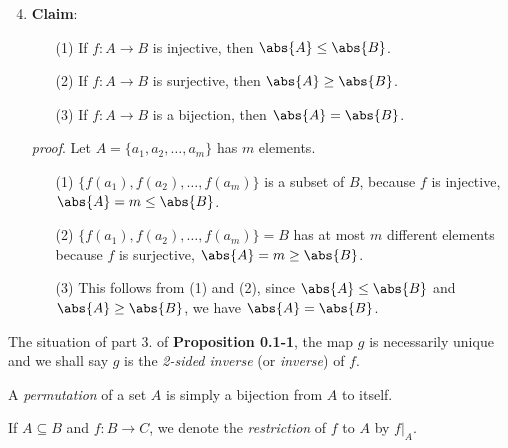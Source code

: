 \newpage
\thispagestyle{oddpagestyle}
\Proppf
{\begin{enumerate}[leftmargin=20pt, itemsep=0pt, topsep=0pt]
    \setcounter{enumi}{3}
    \item {\bf Claim}:
    \begin{itemize}[leftmargin=20pt, itemsep=0pt, topsep=3pt]
        \item [(1)] If $f:A \to B$ is injective, then $\abs{A} \leq \abs{B}$.
        \item [(2)] If $f:A \to B$ is surjective, then $\abs{A} \geq \abs{B}$.
        \item [(3)] If $f:A \to B$ is a bijection, then $\abs{A} = \abs{B}$.
    \end{itemize}
    {\it proof}. Let $A=\{a_{1},a_{2},\dots,a_{m}\}$ has $m$ elements.
    \begin{itemize}[leftmargin=20pt, itemsep=0pt, topsep=3pt]
        \item [(1)] $\{f(a_{1}),f(a_{2}),\dots,f(a_{m})\}$ is a subset of $B$, because $f$ is injective, $\abs{A} = m \leq \abs{B}$.
        \item [(2)] $\{f(a_{1}), f(a_{2}),\dots,f(a_{m})\}=B$ has at most $m$ different elements because $f$ is surjective, $\abs{A} = m \geq \abs{B}$.
        \item [(3)] This follows from (1) and (2), since $\abs{A} \leq \abs{B}$ and $\abs{A} \geq \abs{B}$, we have $\abs{A} = \abs{B}$.
    \end{itemize}
\end{enumerate}
}
The situation of part 3. of \textbf{\textsf{\color{orange!20!brown} Proposition 0.1-1}}, 
the map $g$ is necessarily unique and we shall say $g$ is the {\sl 2-sided inverse} (or {\sl inverse}) of $f$.

A {\sl permutation} of a set $A$ is simply a bijection from $A$ to itself.

If $A\subseteq B$ and $f:B\to C$, we denote the {\sl restriction} of $f$ to $A$ by $f|_{A}$.

